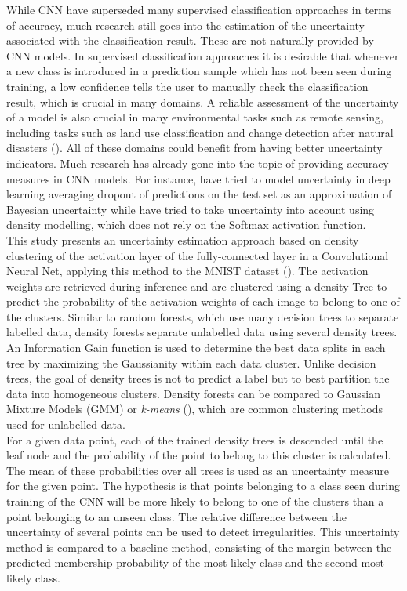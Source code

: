 \documentclass{article}
\begin{document}
While CNN have superseded many supervised classification approaches in terms of accuracy, much research still goes into the estimation of the uncertainty associated with the classification result. These are not naturally provided by CNN models. In supervised classification approaches it is desirable that whenever a new class is introduced in a prediction sample which has not been seen during training, a low confidence tells the user to manually check the classification result, which is crucial in many domains. A reliable assessment of the uncertainty of a model is also crucial in many environmental tasks such as remote sensing, including tasks such as land use classification and change detection after natural disasters (\cite{menderes_automatic_2015, womble_automated_2007, postadjian_investigating_2017}). All of these domains could benefit from having better uncertainty indicators. Much research has already gone into the topic of providing accuracy measures in CNN models. For instance, \cite{ghahramani} have tried to model uncertainty in deep learning averaging dropout of predictions on the test set as an approximation of Bayesian uncertainty while \cite{subramanya} have tried to take uncertainty into account using density modelling, which does not rely on the Softmax activation function.\\


This study presents an uncertainty estimation approach based on density clustering of the activation layer of the fully-connected layer in a Convolutional Neural Net, applying this method to the MNIST dataset (\cite{mnist}). The activation weights are retrieved during inference and are clustered using a density Tree to predict the probability of the activation weights of each image to belong to one of the clusters. Similar to random forests, which use many decision trees to separate labelled data, density forests separate unlabelled data using several density trees. An Information Gain function is used to determine the best data splits in each tree by maximizing the Gaussianity within each data cluster. Unlike decision trees, the goal of density trees is not to predict a label but to best partition the data into homogeneous clusters. Density forests can be compared to Gaussian Mixture Models (GMM) or \textit{k-means} (\cite{decisionForests-MSR}), which are common clustering methods used for unlabelled data.\\

For a given data point, each of the trained density trees is descended until the leaf node and the probability of the point to belong to this cluster is calculated. The mean of these probabilities over all trees is used as an uncertainty measure for the given point. The hypothesis is that points belonging to a class seen during training of the CNN will be more likely to belong to one of the clusters than a point belonging to an unseen class. The relative difference between the uncertainty of several points can be used to detect irregularities. This uncertainty method is compared to a baseline method, consisting of the margin between the predicted membership probability of the most likely class and the second most likely class.
\end{document}
